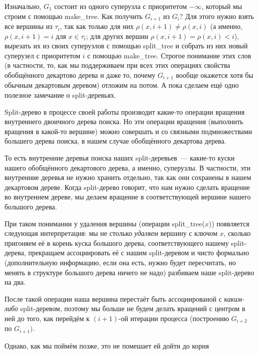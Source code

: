 Изначально, $G_1$ состоит из одного суперузла с приоритетом $-\infty$, который мы строим с помощью \textrm{make\_tree}.
Как получить $G_{i+1}$ из $G_i$? Для этого нужно взять все
вершины из $\tau_i$, так как только для них $\rho(x, i+1) \neq \rho(x,i)$ (а именно, $\rho(x, i + 1) = i$ для $x \in \tau_i$; для других вершин $\rho(x, i + 1) = \rho(x, i) < i$),
вырезать их из своих суперузлов с помощью \textrm{split\_tree} и собрать из них новый суперузел с приоритетом $i$ с помощью \textrm{make\_tree}. Строгое понимание этих слов (в частности, то, как мы поддерживаем при всех этих операциях свойства обобщённого декартово дерева и даже то, почему $G_{i+1}$ вообще окажется хотя бы обычным декартовым деревом) отложим на потом. А пока сделаем ещё одно полезное замечание о split-деревьях.

\begin{remark}
	Split-дерево в процессе своей работы производит какие-то операции вращения внутреннего двоичного дерева поиска. Но эти операции вращения (выполнить вращения в какой-то вершине) можно совершать и со связными подмножествами большего дерева поиска, в нашем случае обобщённого декартова дерева.

	То есть внутренние деревья поиска наших split-деревьев~--- какие-то куски нашего
	обобщённого декартового дерева, а именно, суперузлы. В частности, эти внутренние
	деревья не нужно хранить отдельно, так как они сохранены в нашем декартовом дереве.
	Когда split-дерево говорит, что нам нужно сделать вращение во внутреннем дереве, мы делаем вращение в соответствующей вершине нашего большого дерева.

	При таком понимании у удаления вершины (операции \textrm{split\_tree}($x$)) появляется
	следующая интерпретация: мы не столько \emph{удаляем} вершину с ключом $x$, сколько пригоняем её в корень куска большого дерева, соответствующего нашему split-дерева, прекращаем ассоциировать её с нашим split-деревом и чисто формально (дополнительную информацию, если она есть, нужно будет пересчитать, но менять в структуре большого дерева ничего не надо) разбиваем наше split-дерево на два.

	После такой операции наша вершина перестаёт быть ассоциированой с \emph{каким-либо} split-деревом, поэтому мы больше не будем делать вращений с центром в ней до того, как перейдём к $(i+1)$-ой итерации процесса (построению $G_{i+2}$ по $G_{i+1})$.

	Однако, как мы поймём позже, это не помешает ей дойти до корня
\end{remark}

